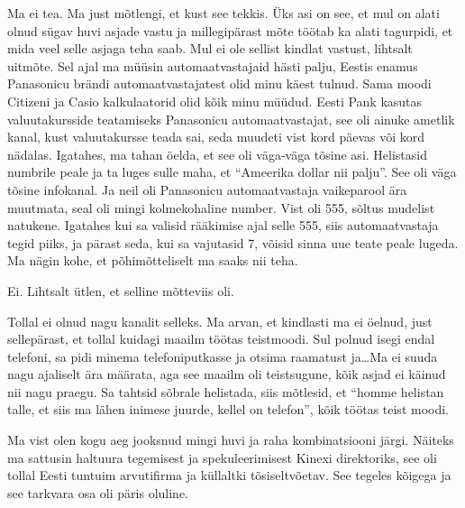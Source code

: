 
Ma ei tea. Ma just mõtlengi, et kust see tekkis. Üks asi on see, et mul on alati olnud sügav huvi asjade vastu ja millegipärast mõte töötab ka alati tagurpidi, et mida veel selle asjaga teha saab. Mul ei ole sellist kindlat vastust, lihtsalt uitmõte. Sel ajal ma müüsin automaatvastajaid hästi palju, Eestis enamus Panasonicu brändi automaatvastajatest olid minu käest tulnud. Sama moodi Citizeni ja Casio kalkulaatorid olid kõik minu müüdud. Eesti Pank kasutas valuutakursside teatamiseks Panasonicu automaatvastajat, see oli ainuke ametlik kanal, kust valuutakursse teada sai, seda muudeti vist kord päevas või kord nädalas. Igatahes, ma tahan öelda, et see oli väga-väga tõsine asi. Helistasid numbrile peale ja ta luges sulle maha, et \enquote{Ameerika dollar nii palju}. See oli väga tõsine infokanal. Ja  neil oli Panasonicu automaatvastaja vaikeparool ära muutmata, seal oli mingi kolmekohaline number. Vist oli 555, sõltus mudelist natukene. Igatahes kui sa valisid rääkimise ajal selle 555, siis  automaatvastaja tegid piiks, ja pärast seda, kui sa vajutasid 7, võisid sinna uue teate peale lugeda. Ma nägin kohe, et põhimõtteliselt ma saaks nii teha. 


Ei. Lihtsalt ütlen, et selline mõtteviis oli. 


Tollal ei olnud nagu kanalit selleks. Ma arvan, et  kindlasti ma ei öelnud, just sellepärast, et tollal kuidagi maailm töötas teistmoodi. Sul polnud isegi endal telefoni, sa pidi minema telefoniputkasse ja otsima raamatust ja\ldots  Ma ei suuda nagu ajaliselt ära määrata, aga see maailm oli teistsugune, kõik asjad ei käinud nii nagu praegu. Sa tahtsid sõbrale helistada, siis mõtlesid, et \enquote{homme helistan talle, et siis ma lähen inimese juurde, kellel on telefon}, kõik töötas teist moodi. 


Ma vist olen kogu aeg jooksnud mingi huvi ja raha kombinatsiooni järgi. Näiteks ma sattusin haltuura tegemisest ja spekuleerimisest  Kinexi direktoriks, see oli tollal Eesti tuntuim arvutifirma ja küllaltki tõsiseltvõetav. See tegeles kõigega ja see tarkvara osa oli päris oluline. 


